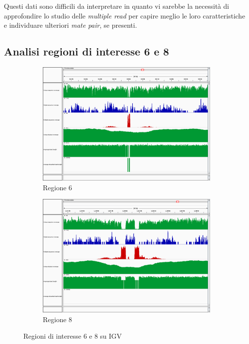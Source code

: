 Questi dati sono difficili da interpretare in quanto vi sarebbe la necessità di approfondire lo studio delle \emph{multiple read} per capire meglio le loro caratteristiche e individuare ulteriori \emph{mate pair}, se presenti.

\subsection{Analisi regioni di interesse 6 e 8}
\begin{figure}[htbp]
	\centering
	\begin{subfigure}[b]{.45\textwidth}
		\includegraphics[width=\textwidth]{immagini/igv_regione6.png}
		\caption{Regione 6}
	\end{subfigure}
	\quad
	\begin{subfigure}[b]{.45\textwidth}
		\includegraphics[width=\textwidth]{immagini/igv_regione8.png}
		\caption{Regione 8}
	\end{subfigure}
\caption{Regioni di interesse 6 e 8 su IGV}
\label{fig:regioni 6 e 8}
\end{figure}

